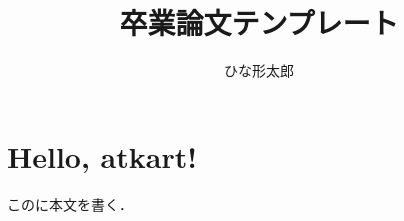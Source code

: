 \documentclass[]{atkart}
\title{卒業論文テンプレート}
\author{ひな形\　太郎}
\begin{document}
\maketitle

\section{Hello, atkart!}

このに本文を書く．
\end{document}
